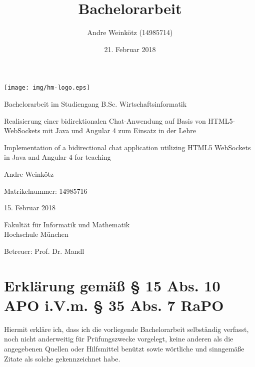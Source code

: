 \documentclass[11pt,a4paper,titlepage]{scrartcl}
\title{Bachelorarbeit}
\author{Andre Weinkötz (14985714)}
\date{21. Februar 2018}
\numberwithin{equation}{section}
\begin{document}
  \pagestyle{empty}
  \renewcommand{\thelstlisting}{\arabic{section}.\arabic{lstlisting}}
\begin{titlepage}

\begin{center}
	\texttt{[image: img/hm-logo.eps]}
\end{center}
 \bigskip

 \begin{center} \large 
    
    Bachelorarbeit im Studiengang B.Sc. Wirtschaftsinformatik
    \vspace*{2cm}
\end{center}
\begin{doublespace}
	{\huge Realisierung einer bidirektionalen Chat-Anwendung auf Basis von HTML5-WebSockets mit Java und Angular 4 zum Einsatz in der Lehre}\\
\vspace{1.5cm}

	{\huge \noindent Implementation of a bidirectional chat application utilizing HTML5 WebSockets in Java and Angular 4 for teaching}
\end{doublespace}

    
    \vspace*{2.0cm}
 \begin{center}
    Andre Weinkötz \bigskip
    
    
    Matrikelnummer: 14985716 \bigskip


    15. Februar 2018
    \vspace*{1.5cm}
    
    

    Fakultät für Informatik und Mathematik \\
	Hochschule München\bigskip
	
	Betreuer: Prof. Dr. Mandl 
	
	
  \end{center}
\end{titlepage}
\newpage
\section*{Erklärung gemäß § 15 Abs. 10 APO i.V.m. § 35 Abs. 7 RaPO}
Hiermit erkläre ich, dass ich die vorliegende Bachelorarbeit selbständig verfasst, noch nicht anderweitig für Prüfungszwecke vorgelegt, keine anderen als die angegebenen Quellen oder Hilfsmittel benützt sowie wörtliche und sinngemäße Zitate als solche gekennzeichnet habe.
\vspace*{3cm}
\end{document}
